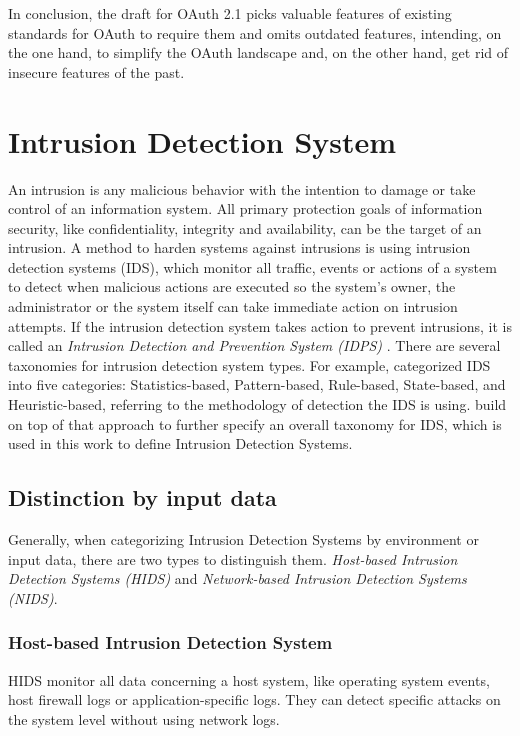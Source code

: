 \documentclass[
    fontsize=12pt,
    headings=small,
    parskip=half,           %
    bibliography=totoc,
    numbers=noenddot,       %
    open=any,               %
    ]{scrreprt}
\begin{document}
In conclusion, the draft for OAuth 2.1 picks valuable features of existing standards for OAuth to require them and omits outdated features, intending, on the one hand, to simplify the OAuth landscape and, on the other hand, get rid of insecure features of the past.

\section{Intrusion Detection System}
An intrusion is any malicious behavior with the intention to damage or take control of an information system. All primary protection goals of information security, like confidentiality, integrity and availability, can be the target of an intrusion. A method to harden systems against intrusions is using intrusion detection systems (IDS), which monitor all traffic, events or actions of a system to detect when malicious actions are executed so the system's owner, the administrator or the system itself can take immediate action on intrusion attempts. If the intrusion detection system takes action to prevent intrusions, it is called an \emph{Intrusion Detection and Prevention System (IDPS)} \cite{scarfone2010intrusion}. There are several taxonomies for intrusion detection system types. For example, \cite{Liao2013IntrusionDS} categorized IDS into five categories: Statistics-based, Pattern-based, Rule-based, State-based, and Heuristic-based, referring to the methodology of detection the IDS is using. \cite{khraisat2019survey} build on top of that approach to further specify an overall taxonomy for IDS, which is used in this work to define Intrusion Detection Systems. 

\subsection{Distinction by input data}
Generally, when categorizing Intrusion Detection Systems by environment or input data, there are two types to distinguish them. 
\emph{Host-based Intrusion Detection Systems (HIDS)} and \emph{Network-based Intrusion Detection Systems (NIDS)}.
\subsubsection{Host-based Intrusion Detection System}
HIDS monitor all data concerning a host system, like operating system events, host firewall logs or application-specific logs. They can detect specific attacks on the system level without using network logs.
\end{document}
